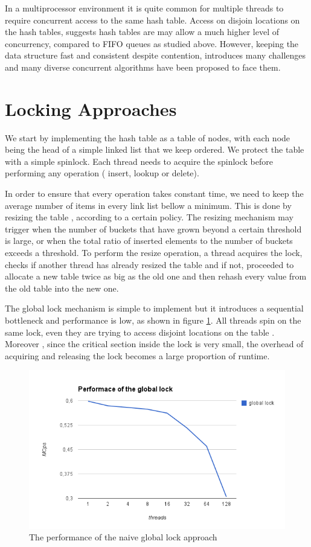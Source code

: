 In a multiprocessor environment it is quite common for multiple threads to require concurrent access to the same hash table. Access on disjoin locations on the hash tables, suggests hash tables are may allow a much higher level of concurrency, compared to FIFO queues as studied above. However, keeping the data structure fast and consistent despite contention, introduces many challenges and many diverse concurrent algorithms have been proposed to face them.
   

\section{ Locking Approaches}

We start by implementing the hash table as a table of nodes, with each node being the head of a simple linked list that we keep ordered. We protect the table with a simple spinlock. Each thread needs to acquire the spinlock before performing any operation ( insert, lookup or delete). 

In order to ensure that every operation takes constant time, we need to keep the average number of items in every link list bellow a minimum. This is done by resizing the table , according to a certain policy. The resizing mechanism may trigger when the number of buckets that have grown beyond a certain threshold is large, or when the total ratio of inserted elements to the number of buckets exceeds a threshold. To perform the resize operation, a thread acquires the lock, checks if another thread has already resized the table and if not, proceeded to allocate a new table twice as big as the old one and then rehash every value from the old table into the new one.

The global lock mechanism is simple to implement but it introduces a sequential bottleneck and performance is low, as shown in figure \ref{hashes_global_perf}. All threads spin on the same lock, even they are trying to access disjoint locations on the table . Moreover , since the critical section inside the lock is very small, the overhead of acquiring and releasing the lock becomes a large proportion of runtime.

\begin{figure}
 \centering
  \includegraphics[scale=0.7]{hashes_global_perf.png}
\caption{The performance of the naive global lock approach}
\label{hashes_global_perf}
\end{figure}

